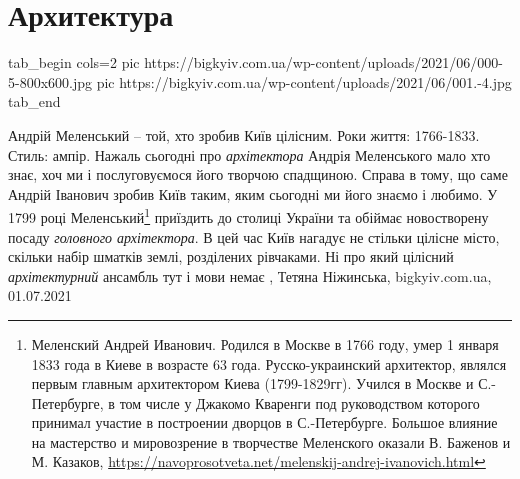 
 
 
 
 
\chapter{Архитектура}


\ifcmt
  tab_begin cols=2
     pic https://bigkyiv.com.ua/wp-content/uploads/2021/06/000-5-800x600.jpg
     pic https://bigkyiv.com.ua/wp-content/uploads/2021/06/001.-4.jpg
  tab_end
\fi

Андрій Меленський – той, хто зробив Київ цілісним.  Роки життя: 1766-1833.
Стиль: ампір.
Нажаль сьогодні про \emph{архітектора} Андрія Меленського мало хто знає, хоч ми і
послуговуємося його творчою спадщиною. Справа в тому, що саме Андрій Іванович
зробив Київ таким, яким сьогодні ми його знаємо і любимо.
У 1799 році Меленський\footnote{
Меленский Андрей Иванович. Родился в Москве в 1766 году, умер 1 января 1833
года в Киеве в возрасте 63 года. Русско-украинский архитектор, являлся первым
главным архитектором Киева (1799-1829гг).  Учился в Москве и С.-Петербурге, в
том числе у Джакомо Кваренги под руководством которого принимал участие в
построении дворцов в С.-Петербурге. Большое влияние на мастерство и
мировозрение в творчестве Меленского оказали В. Баженов и М. Казаков,  
\url{https://navoprosotveta.net/melenskij-andrej-ivanovich.html}
} приїздить до столиці України та обіймає новостворену
посаду \emph{головного архітектора}. В цей час Київ нагадує не стільки цілісне місто,
скільки набір шматків землі, розділених рівчаками. Ні про який цілісний
\emph{архітектурний} ансамбль тут і мови немає
, 
Тетяна Ніжинська, bigkyiv.com.ua, 01.07.2021

